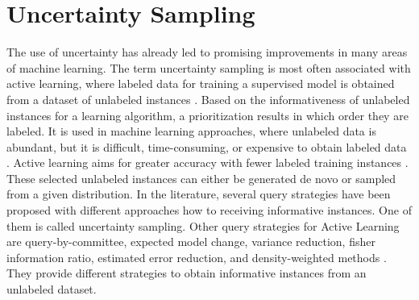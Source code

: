 \section{Uncertainty Sampling} 
\label{sec:uncertaintysampling}
%
The use of uncertainty has already led to promising improvements in many areas of machine learning.
The term uncertainty sampling is most often associated with active learning, where labeled data for training a supervised model is obtained from a dataset of unlabeled instances \cite{Settles2009ActiveLL}.
Based on the informativeness of unlabeled instances for a learning algorithm, a prioritization results in which order they are labeled.
It is used in machine learning approaches, where unlabeled data is abundant, but it is difficult, time-consuming, or expensive to obtain labeled data \cite{Settles2009ActiveLL}.
Active learning aims for greater accuracy with fewer labeled training instances \cite{Settles2009ActiveLL}.
These selected unlabeled instances can either be generated de novo or sampled from a given distribution.
In the literature, several query strategies have been proposed with different approaches how to receiving informative instances.
One of them is called uncertainty sampling.
Other query strategies for Active Learning are query-by-committee, expected model change, variance reduction, fisher information ratio, estimated error reduction, and density-weighted methods \cite{Settles2009ActiveLL}.
They provide different strategies to obtain informative instances from an unlabeled dataset.

